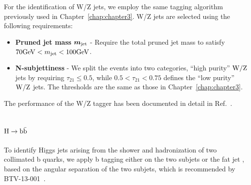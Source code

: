 For the identification of W/Z jets, we employ the same tagging algorithm 
previously used in Chapter~\ref{chap:chapter3}.  W/Z jets are selected using the following
requirements:
\begin{itemize}

\item {\bf Pruned jet mass}  $\mbox{\boldmath$m_{\text{jet}}$}$
  - Require the total pruned jet mass to satisfy $70 \mathrm{GeV} < m_\text{jet} <  100 \mathrm{GeV} $.

\item {\bf N-subjettiness} 
  - We split the events into two categories, ``high purity'' ${\rm W}/{\rm Z}$ jets by
    requiring $\tau_{21} \leq 0.5$, while $ 0.5 < \tau_{21} < 0.75$ defines 
    the ``low purity'' ${\rm W}/{\rm Z}$ jets.  The thresholds are the same as those in 
    Chapter~\ref{chap:chapter3}. 
\end{itemize}
The performance of the W/Z tagger has been documented in detail in Ref.~\cite{JME-13-006}.















\subsection{${\rm H \to b\bar{b}}$}
\label{sec:higgsTaggerbb}

To identify Higgs jets arising from the shower and hadronization of two 
collimated b quarks, we apply b tagging either on the two subjets or the
fat jet , based on the angular separation of the two subjets, which is 
recommended by BTV-13-001~\cite{BTV-13-001}. 

